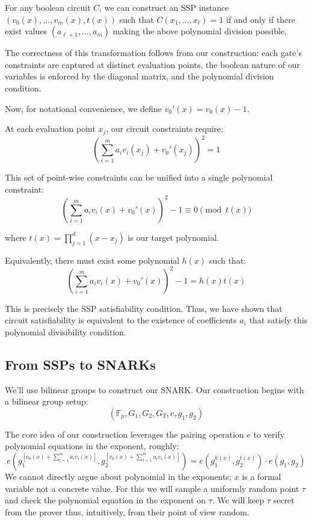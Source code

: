For any boolean circuit $C$, we can construct an SSP instance $(v_0(x),\ldots,v_m(x),t(x))$ such that $C(x_1,\ldots,x_\ell) = 1$ if and only if there exist values $(a_{\ell+1},\ldots,a_m)$ making the above polynomial division possible.

The correctness of this transformation follows from our construction: each gate's constraints are captured at distinct evaluation points, the boolean nature of our variables is enforced by the diagonal matrix, and the polynomial division condition.




Now, for notational convenience, we define $v_0'(x) = v_0(x) - 1$. 

At each evaluation point $x_j$, our circuit constraints require:
\[ \left(\sum_{i=1}^m a_i v_i(x_j) + v_0'(x_j)\right)^2 = 1 \]

This set of point-wise constraints can be unified into a single polynomial constraint:
\[ \left(\sum_{i=1}^m a_i v_i(x) + v_0'(x)\right)^2 - 1 \equiv 0 \pmod{t(x)} \]

where $t(x) = \prod_{j=1}^d (x - x_j)$ is our target polynomial.

Equivalently, there must exist some polynomial $h(x)$ such that:
\[ \left(\sum_{i=1}^m a_i v_i(x) + v_0'(x)\right)^2 - 1 = h(x)t(x) \]

This is precisely the SSP satisfiability condition. Thus, we have shown that circuit satisfiability is equivalent to the existence of coefficients $a_i$ that satisfy this polynomial divisibility condition.

\subsection{From SSPs to SNARKs}

We'll use bilinear groups to construct our SNARK. Our construction begins with a bilinear group setup:
\[ (\mathbb{F}_p, G_1, G_2, G_T, e, g_1, g_2) \]

The core idea of our construction leverages the pairing operation $e$ to verify polynomial equations in the exponent, roughly:
\[ e(g_1^{[v_0(x) + \sum_{i=1}^m a_i v_i(x)]}, g_2^{[v_0(x) + \sum_{i=1}^m a_i v_i(x)]}) = e(g_1^{h(x)}, g_2^{t(x)}) \cdot e(g_1, g_2) \]
We cannot directly argue about polynomial in the exponents; $x$ is a formal variable not a concrete value. For this we will sample a uniformly random point $\tau$ and check the polynomial equation in the exponent on $\tau$. We will keep $\tau$ secret from the prover thus, intuitively, from their point of view random.

